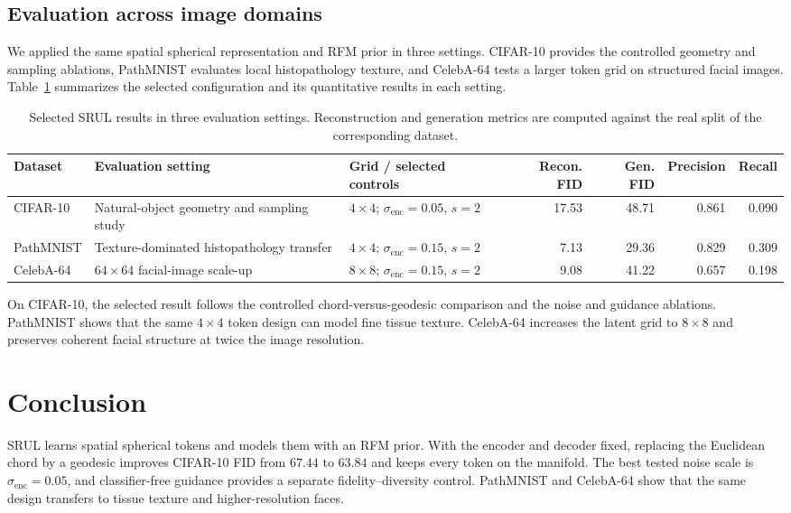 \documentclass{article}
\begin{document}
\subsection*{Evaluation across image domains}
We applied the same spatial spherical representation and RFM prior in three settings. CIFAR-10 provides the controlled geometry and sampling ablations, PathMNIST evaluates local histopathology texture, and CelebA-64 tests a larger token grid on structured facial images. Table~\ref{tab:domains} summarizes the selected configuration and its quantitative results in each setting.

\begin{table}[H]
\centering
\small
\caption{Selected SRUL results in three evaluation settings. Reconstruction and generation metrics are computed against the real split of the corresponding dataset.}
\label{tab:domains}
\setlength{\tabcolsep}{3.2pt}
\renewcommand{\arraystretch}{1.12}
\begin{tabular}{p{1.35cm}p{3.15cm}p{2.35cm}rrrr}
\toprule
Dataset & Evaluation setting & Grid / selected controls & Recon. FID & Gen. FID & Precision & Recall \\
\midrule
CIFAR-10 & Natural-object geometry and sampling study & $4\times4$; $\sigma_{\mathrm{enc}}=0.05$, $s=2$ & 17.53 & 48.71 & 0.861 & 0.090 \\
PathMNIST & Texture-dominated histopathology transfer & $4\times4$; $\sigma_{\mathrm{enc}}=0.15$, $s=2$ & 7.13 & 29.36 & 0.829 & 0.309 \\
CelebA-64 & $64\times64$ facial-image scale-up & $8\times8$; $\sigma_{\mathrm{enc}}=0.15$, $s=2$ & 9.08 & 41.22 & 0.657 & 0.198 \\
\bottomrule
\end{tabular}
\end{table}

On CIFAR-10, the selected result follows the controlled chord-versus-geodesic comparison and the noise and guidance ablations. PathMNIST shows that the same $4\times4$ token design can model fine tissue texture. CelebA-64 increases the latent grid to $8\times8$ and preserves coherent facial structure at twice the image resolution.


\section{Conclusion}
SRUL learns spatial spherical tokens and models them with an RFM prior. With the encoder and decoder fixed, replacing the Euclidean chord by a geodesic improves CIFAR-10 FID from $67.44$ to $63.84$ and keeps every token on the manifold. The best tested noise scale is $\sigma_{\mathrm{enc}}=0.05$, and classifier-free guidance provides a separate fidelity--diversity control. PathMNIST and CelebA-64 show that the same design transfers to tissue texture and higher-resolution faces.
\end{document}
